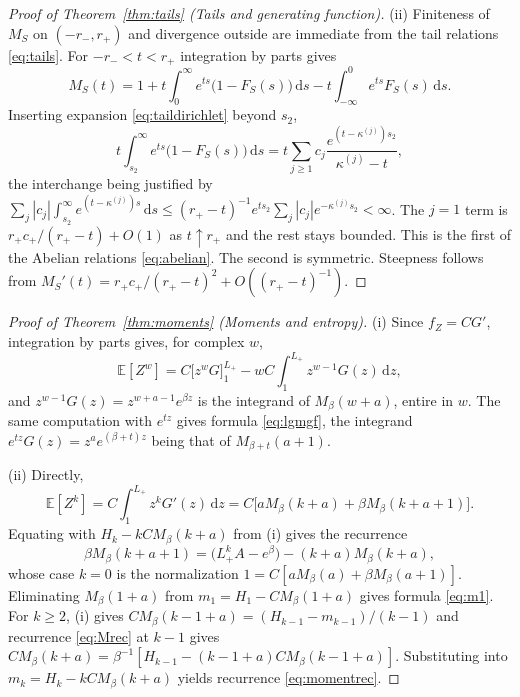 \documentclass[sn-mathphys-num]{sn-jnl}\newcommand{\SNJNL}{}
\theoremstyle{thmstyleone}
\theoremstyle{thmstyletwo}
\theoremstyle{thmstylethree}
\theoremstyle{thmstyleone}
\providecommand{\E}{\mathbb{E}}
\providecommand{\dd}{\,\mathrm{d}}
\begin{document}
\begin{appendices}
\begin{proof}[Proof of Theorem~\ref{thm:tails} (Tails and generating function)]
			\noindent(ii) Finiteness of $M_S$ on $(-r_-,r_+)$ and divergence outside are
			immediate from the tail relations \eqref{eq:tails}. For $-r_-<t<r_+$ integration by
			parts gives
			\begin{equation}\label{eq:mgfparts}
				M_S(t)=1+t\int_0^{\infty}e^{ts}\bigl(1-F_S(s)\bigr)\dd s
				-t\int_{-\infty}^{0}e^{ts}F_S(s)\dd s .
			\end{equation}
			Inserting expansion \eqref{eq:taildirichlet} beyond $s_2$,
			\begin{equation}\label{eq:mgfseries}
				t\int_{s_2}^{\infty}e^{ts}\bigl(1-F_S(s)\bigr)\dd s
				=t\sum_{j\ge1}c_j\frac{e^{(t-\kappa^{(j)})s_2}}{\kappa^{(j)}-t},
			\end{equation}
			the interchange being justified by
			$\sum_j|c_j|\int_{s_2}^\infty e^{(t-\kappa^{(j)})s}\dd s
			\le(r_+-t)^{-1}e^{ts_2}\sum_j|c_j|e^{-\kappa^{(j)}s_2}<\infty$.
			The $j=1$ term is $r_+c_+/(r_+-t)+O(1)$ as $t\uparrow r_+$ and the
			rest stays bounded. This is the first of the Abelian relations
			\eqref{eq:abelian}. The second is symmetric. Steepness follows from
			$M_S'(t)=r_+c_+/(r_+-t)^{2}+O((r_+-t)^{-1})$.
			
		\end{proof}
		
		\begin{proof}[Proof of Theorem~\ref{thm:moments} (Moments and entropy)]\leavevmode
			
			\noindent(i) Since $f_Z=CG'$, integration by parts gives, for complex $w$,
			\begin{equation}\label{eq:momentparts}
				\E[Z^{w}]=C\bigl[z^{w}G\bigr]_1^{L_+}-wC\int_1^{L_+}z^{w-1}G(z)\dd z,
			\end{equation}
			and $z^{w-1}G(z)=z^{w+a-1}e^{\beta z}$ is the integrand of
			$M_\beta(w+a)$, entire in $w$. The same computation with $e^{tz}$
			gives formula \eqref{eq:lgmgf}, the integrand $e^{tz}G(z)=z^{a}e^{(\beta+t)z}$
			being that of $M_{\beta+t}(a+1)$.
			
			\noindent(ii) Directly,
			\begin{equation}\label{eq:momentdirect}
				\E[Z^{k}]=C\int_1^{L_+}z^{k}G'(z)\dd z
				=C\bigl[aM_\beta(k+a)+\beta M_\beta(k+a+1)\bigr].
			\end{equation}
			Equating with $H_k-kCM_\beta(k+a)$ from (i) gives the recurrence
			\begin{equation}\label{eq:Mrec}
				\beta M_\beta(k+a+1)=\bigl(L_+^{k}A-e^{\beta}\bigr)-(k+a)M_\beta(k+a),
			\end{equation}
			whose case $k=0$ is the normalization
			$1=C[aM_\beta(a)+\beta M_\beta(a+1)]$. Eliminating $M_\beta(1+a)$
			from $m_1=H_1-CM_\beta(1+a)$ gives formula \eqref{eq:m1}. For $k\ge2$, (i)
			gives $CM_\beta(k-1+a)=(H_{k-1}-m_{k-1})/(k-1)$ and recurrence \eqref{eq:Mrec}
			at $k-1$ gives
			$CM_\beta(k+a)=\beta^{-1}[H_{k-1}-(k-1+a)CM_\beta(k-1+a)]$.
			Substituting into $m_k=H_k-kCM_\beta(k+a)$ yields
			recurrence \eqref{eq:momentrec}.
			

\end{proof}
\end{appendices}
\end{document}
